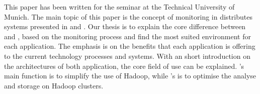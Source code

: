 
This paper has been written for the seminar \isdslong at the Technical University of Munich. 
The main topic of this paper is the concept of monitoring in distributes systems presented in \ambshort and \chukshort. 
Our thesis is to explain the core difference between \ambshort and \chukshort, based on the monitoring process and find the most suited environment for each application. 
The emphasis is on the benefits that each application is offering to the current technology processes and systems. 
With an short introduction on the architectures of both application, the core field of use can be explained. 
\ambshort's main function is to simplify the use of Hadoop, while \chukshort's is to optimise the analyse and storage on Hadoop clusters. 